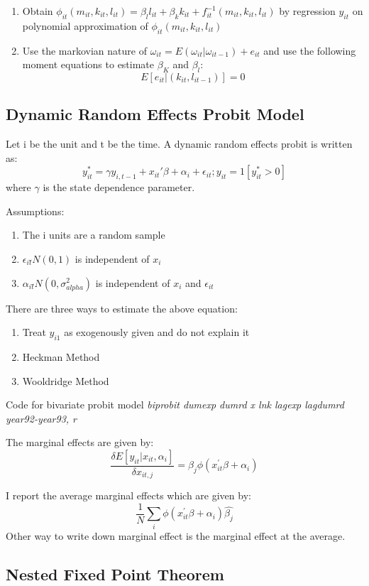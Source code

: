 \documentclass[11pt]{article}
\begin{document}
\begin{enumerate}
\item Obtain $\phi_{it}(m_{it}, k_{it}, l_{it}) = \beta_{l}l_{it} + \beta_k k_{it} + f_{it}^{-1}(m_{it},
k_{it}, l_{it})$ by regression $y_{it}$ on polynomial approximation of
$\phi_{it}(m_{it}, k_{it}, l_{it})$
\item Use the markovian nature of $\omega_{it} =
  E(\omega_{it}|\omega_{it-1}) + e_{it}$
and use the following moment equations to estimate $\beta_{K}$ and
$\beta_{l}$:
\begin{equation}
E[e_{it}|(k_{it}, l_{it-1})]= 0
\end{equation}
\end{enumerate} 

 


\subsection{Dynamic Random Effects Probit  Model}
Let i be the unit and t be the time. A dynamic random effects probit
is written as: 
$$ y_{it}^{*} = \gamma y_{i,t-1} + x_{it}'\beta + \alpha_{i} +
\epsilon_{it}; y_{it}=1[y_{it}^{*} > 0]$$
where $\gamma$ is the state dependence parameter.

Assumptions: 

\begin{enumerate}
\item The i units are a random sample
\item $\epsilon_{it} \tilde{} N(0,1)$ is independent of $x_{i}$
\item $\alpha_{it} \tilde{} N(0,\sigma_{alpha}^{2})$ is independent of
  $x_{i}$ and $\epsilon_{it}$
\end{enumerate}

There are three ways to estimate the above equation: 
\begin{enumerate}
\item Treat $y_{i1}$ as exogenously given and do not explain it
\item Heckman Method
\item Wooldridge Method
\end{enumerate} 
Code for bivariate probit model 
\textit{biprobit dumexp dumrd x lnk lagexp lagdumrd year92-year93, r}

The marginal effects are given by:
\begin{equation}
\frac{\delta E[y_{it}|x_{it}, \alpha_{i}]}{\delta x_{it,j}} =
\beta_{j}\phi(x_{it}^{'} \beta + \alpha_{i})
\end{equation}

I report the average marginal effects which are given by: 
$$ \frac{1}{N} \sum_{i}\phi( x_{it}^{'} \beta + \alpha_{i})
\hat{\beta_{j}}$$
Other way to write down marginal effect is the marginal effect at the
average. 

\subsection{Nested Fixed Point Theorem}
\end{document}
